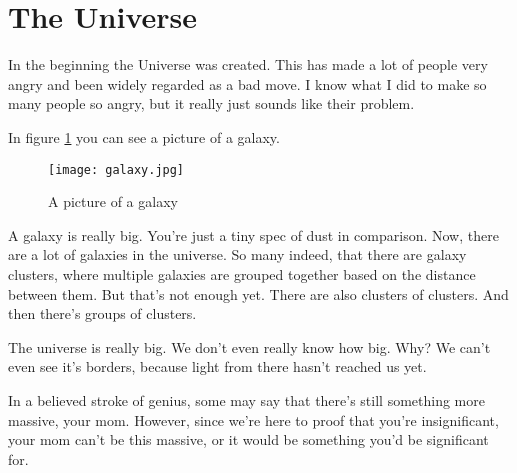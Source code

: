 \maketitle
\section*{The Universe}
In the beginning the Universe was created. This has made a lot of people very angry and been widely regarded as a bad move.
I know what I did to make so many people so angry, but it really just sounds like their problem.

In figure \ref{fig:universe} you can see a picture of a galaxy.

\begin{figure}[h]
  \center
  \texttt{[image: galaxy.jpg]}
  \caption{A picture of a galaxy}
  \label{fig:universe}
\end{figure}

A galaxy is really big. You're just a tiny spec of dust in comparison. Now, there are a lot of galaxies in the universe.
So many indeed, that there are galaxy clusters, where multiple galaxies are grouped together based on the distance between them.
But that's not enough yet. There are also clusters of clusters. And then there's groups of clusters.

The universe is really big. We don't even really know how big. Why? We can't even see it's borders, because light from there hasn't reached us yet.

In a believed stroke of genius, some may say that there's still something more massive, your mom. However, since we're here to proof that you're insignificant,
your mom can't be this massive, or it would be something you'd be significant for.




